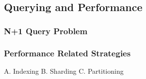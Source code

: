 \subsection[Querying and Performance]{Querying and Performance}

\subsubsection[N+1 Query Problem]{N+1 Query Problem}

\subsubsection[Performance Related Strategies]{Performance Related Strategies}
A. Indexing 
B. Sharding 
C. Partitioning 